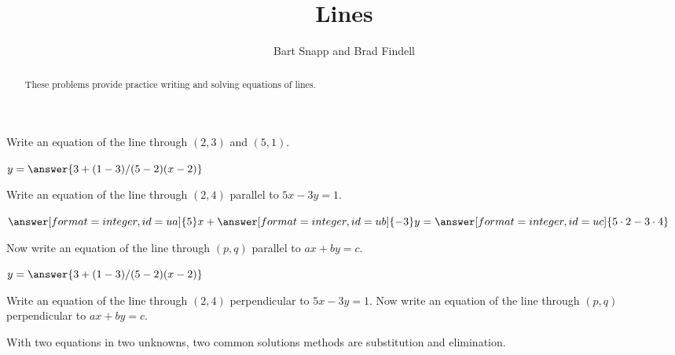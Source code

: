 \documentclass[nooutcomes]{ximera}
\title{Lines}
\author{Bart Snapp and Brad Findell}
\begin{document}
\begin{abstract}
These problems provide practice writing and solving equations of lines. 
\end{abstract}
\maketitle

\begin{problem}
Write an equation of the line through $(2,3)$ and $(5,1)$.  

\begin{prompt}
$y = \answer{3+(1-3)/(5-2)(x-2)}$
\end{prompt}
\end{problem}


\begin{problem}
Write an equation of the line through $(2,4)$ parallel to $5x-3y=1$.  

  \begin{prompt}
    \begin{validator}[(-3*ua==5*ub) && (-3*uc==(5*2-3*4)*ub) && (ub != 0)]
      \(
         \answer[format=integer,id=ua]{5}x + \answer[format=integer,id=ub]{-3}y = 
         \answer[format=integer,id=uc]{5\cdot2-3\cdot4}
      \)
    \end{validator}
  \end{prompt}
\end{problem}



\begin{problem}
Now write an equation of the line through $(p,q)$ parallel to $ax+by=c$. 

\begin{prompt}
$y = \answer{3+(1-3)/(5-2)(x-2)}$
\end{prompt}
\end{problem}

\begin{problem}
Write an equation of the line through $(2,4)$ perpendicular to $5x-3y=1$.  
Now write an equation of the line through $(p,q)$ perpendicular to $ax+by=c$. 
\end{problem}


%
%
%
%
With two equations in two unknowns, two common solutions methods are substitution and elimination.  
\end{document}
